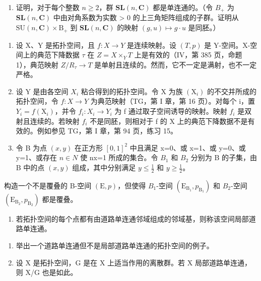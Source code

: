 \begin{enumerate}
\def\labelenumi{\alph{enumi})}
\setcounter{enumi}{1}
\tightlist
\item
  证明，对于每个整数 \(n \geqslant 2\)，群 \(\mathbf{SL}(n, \mathbf{C})\) 都是单连通的。（令 \(B_{+}\) 为 \(\mathbf{SL}(n, \mathbf{C})\) 中由对角系数为实数 \textgreater{} 0 的上三角矩阵组成的子群。证明从 \(\mathrm{SU}(n, \mathbf{C}) \times \mathrm{B}_{+}\) 到 \(\mathbf{SL}(n, \mathbf{C})\) 的映射 \((g, u) \mapsto g \cdot u\) 是同胚。）
\end{enumerate}

\exercisegroup

\begin{enumerate}
\def\labelenumi{\arabic{enumi})}
\item
  设 X、Y 是拓扑空间，且 \(f: X \to Y\) 是连续映射。设 \((T, p)\) 是 Y-空间。X-空间上的典范下降数据 \(\tau\) 在 \(Z = X \times_{Y} T\) 上是有效的（IV，第 385 页，命题 1），典范映射 \(Z/R_{\tau} \to T\) 是单射且连续的。然而，它不一定是满射，也不一定严格。
\item
  设 Y 是由各空间 \(X_{i}\) 粘合得到的拓扑空间。令 X 为族 \((\mathrm{X}_{i})\) 的不交并所成的拓扑空间，令 \(f: X \to Y\) 为典范映射（TG，第 I 章，第 16 页）。对每个 i，置 \(Y_{i} = f(\mathrm{X}_{i})\)，并令 \(f_{i}: X_{i} \to Y_{i}\) 为 f 通过取子空间诱导的映射。映射 \(f_{i}\) 是双射且连续的。若映射 \(f_{i}\) 不是同胚，则相对于 f 的 X 上的典范下降数据不是有效的。例如参见 TG，第 I 章，第 94 页，练习 15。
\item
  令 B 为点 \((x,y)\) 在正方形 \([0,1]^{2}\) 中且满足 x=0、或 x=1、或 y=0、或 y=1、或存在 \(n\in N\) 使 nx=1 所成的集合。令 \(B_{1}\) 和 \(B_{2}\) 分别为 B 的子集，由 B 中的点 \((x,y)\) 组成，其中分别满足 \(y\leqslant\frac{1}{2}\) 和 \(y\geqslant\frac{1}{2}\)。
\end{enumerate}

构造一个不是覆叠的 B-空间 \((\mathrm{E}, p)\)，但使得 \(B_{1}\)-空间 \((\mathrm{E}_{\mathrm{B}_{1}}, p_{\mathrm{B}_{1}})\) 和 \(B_{2}\)-空间 \((\mathrm{E}_{\mathrm{B}_{2}}, p_{\mathrm{B}_{2}})\) 都是覆叠。

\begin{enumerate}
\def\labelenumi{\arabic{enumi})}
\setcounter{enumi}{3}
\tightlist
\item
  若拓扑空间的每个点都有由道路单连通邻域组成的邻域基，则称该空间局部道路单连通。
\end{enumerate}

\begin{enumerate}
\def\labelenumi{\alph{enumi})}
\item
  举出一个道路单连通但不是局部道路单连通的拓扑空间的例子。
\item
  设 X 是拓扑空间，G 是在 X 上适当作用的离散群。若 X 局部道路单连通，则 X/G 也是如此。
\end{enumerate}

